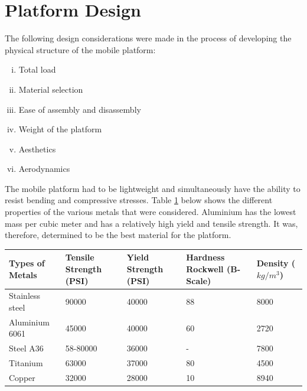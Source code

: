 \section{Platform Design}
The following design considerations were made in the process of developing the physical structure of the mobile platform:
\begin{enumerate}[i.]
    \item Total load
    \item Material selection
    \item Ease of assembly and disassembly
    \item Weight of the platform
    \item Aesthetics
    \item Aerodynamics
\end{enumerate}
The mobile platform had to be lightweight and simultaneously have the ability to resist bending and compressive stresses. Table \ref{table:materialproperties} below shows the different properties of the various metals that were considered. Aluminium has the lowest mass per cubic meter and has a relatively high yield and tensile strength. It was, therefore, determined to be the best material for the platform.

\begin{table}[H]
  \begin{center}
      \leavevmode
     \begin{tabular}{| m{3cm} | m{2cm} | m{2cm} | m{2cm} | m{3cm} |}\hline
      Types of Metals & Tensile Strength (PSI) & Yield Strength (PSI) & Hardness Rockwell (B-Scale) & Density (\(kg/m^3\)) \\
      \hline
         Stainless steel   & 90000    & 40000 & 88 & 8000\\
         \hline
         Aluminium 6061 & 45000 & 40000 & 60 & 2720\\
         \hline
         Steel A36   & 58-80000 & 36000  & - & 7800  \\
         \hline
         Titanium & 63000 & 37000 & 80 & 4500 \\
         \hline
         Copper & 32000 & 28000 & 10 & 8940 \\
    \hline
    \end{tabular}

    \label{table:materialproperties}
  \end{center}
\end{table}


